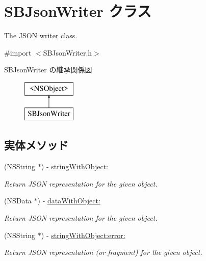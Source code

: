\hypertarget{interface_s_b_json_writer}{}\section{S\+B\+Json\+Writer クラス}
\label{interface_s_b_json_writer}


The J\+S\+O\+N writer class.  




{\ttfamily \#import $<$S\+B\+Json\+Writer.\+h$>$}

S\+B\+Json\+Writer の継承関係図\begin{figure}[H]
\begin{center}
\leavevmode
\includegraphics[height=2.000000cm]{interface_s_b_json_writer}
\end{center}
\end{figure}
\subsection*{実体メソッド}
\begin{DoxyCompactItemize}
\item 
(N\+S\+String $\ast$) -\/ \hyperlink{interface_s_b_json_writer_a9018ceff9753092b310a43782c5083ed}{string\+With\+Object\+:}
\begin{DoxyCompactList}\small\item\em Return J\+S\+O\+N representation for the given object. \end{DoxyCompactList}\item 
(N\+S\+Data $\ast$) -\/ \hyperlink{interface_s_b_json_writer_ad16f43f23b20d93983dae3441675a028}{data\+With\+Object\+:}
\begin{DoxyCompactList}\small\item\em Return J\+S\+O\+N representation for the given object. \end{DoxyCompactList}\item 
(N\+S\+String $\ast$) -\/ \hyperlink{interface_s_b_json_writer_a41cfe2a66c774790785a841633cc0bc4}{string\+With\+Object\+:error\+:}
\begin{DoxyCompactList}\small\item\em Return J\+S\+O\+N representation (or fragment) for the given object. \end{DoxyCompactList}\end{DoxyCompactItemize}
